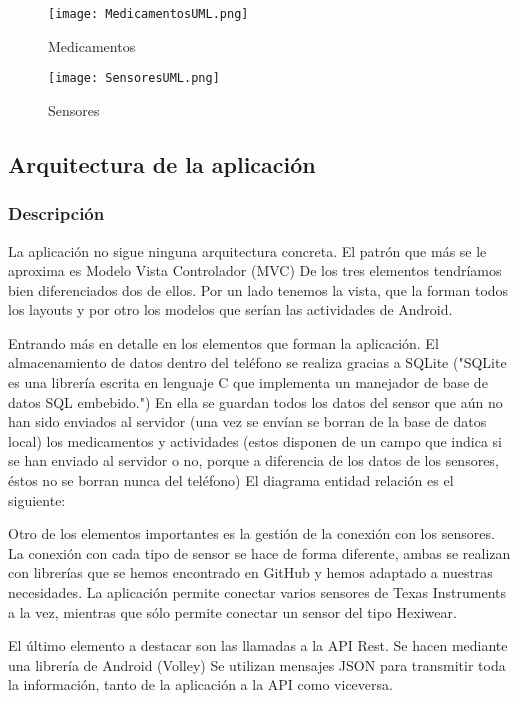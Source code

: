 \documentclass[11pt,spanish]{article}
\begin{document}
\begin{figure}[!htb]
%
  \texttt{[image: MedicamentosUML.png]}
  \caption{Medicamentos}
\endminipage
{}%
  \texttt{[image: SensoresUML.png]}
  \caption{Sensores}
\endminipage
\end{figure}
\newpage

\subsection{Arquitectura de la aplicación}
\subsubsection{Descripción}
La aplicación no sigue ninguna arquitectura concreta. El patrón que más se le aproxima es Modelo Vista Controlador (MVC) De los tres elementos tendríamos bien diferenciados dos de ellos. Por un lado tenemos la vista, que la forman todos los layouts y por otro los modelos que serían las actividades de Android.
\newline

Entrando más en detalle en los elementos que forman la aplicación. El almacenamiento de datos dentro del teléfono se realiza gracias a SQLite ("SQLite es una librería escrita en lenguaje C que implementa un manejador de base de datos SQL embebido.") En ella se guardan todos los datos del sensor que aún no han sido enviados al servidor (una vez se envían se borran de la base de datos local) los medicamentos y actividades (estos disponen de un campo que indica si se han enviado al servidor o no, porque a diferencia de los datos de los sensores, éstos no se borran nunca del teléfono) El diagrama entidad relación es el siguiente:
\newline

Otro de los elementos importantes es la gestión de la conexión con los sensores. La conexión con cada tipo de sensor se hace de forma diferente, ambas se realizan con librerías que se hemos encontrado en GitHub y hemos adaptado a nuestras necesidades. La aplicación permite conectar varios sensores de Texas Instruments a la vez, mientras que sólo permite conectar un sensor del tipo Hexiwear.
\newline

El último elemento a destacar son las llamadas a la API Rest. Se hacen mediante una librería de Android (Volley) Se utilizan mensajes JSON para transmitir toda la información, tanto de la aplicación a la API como viceversa.
\end{document}
